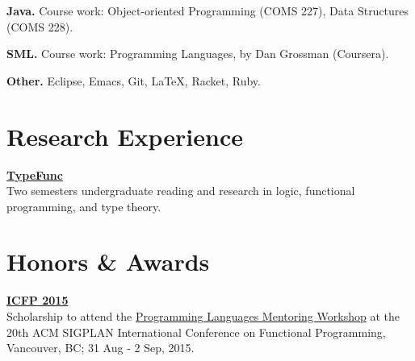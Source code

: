 \documentclass[margin,line]{resume}
\begin{document}
\begin{resume}
    \textbf{Java.} Course work: Object-oriented Programming 
    ({\small COMS 227}), Data Structures ({\small COMS 228}).
   
    \textbf{SML.} Course work: Programming Languages, by Dan Grossman (Coursera).

    \textbf{Other.} Eclipse, Emacs, Git, \LaTeX, Racket, Ruby.

    \section{\mysidestyle Research Experience} 
    {\bf \href{https://github.com/TypeFunc}{TypeFunc}}\\ Two semesters undergraduate reading and research in logic, functional programming, and type theory.
    
    \section{\mysidestyle Honors \& Awards} 

    {\bf \href{http://icfpconference.org/icfp2015/}{ICFP 2015}}\\
    Scholarship to attend the
    \href{https://www.cis.upenn.edu/~sweirich/icfp-plmw15/}{Programming 
    Languages Mentoring Workshop} at the
    20th ACM SIGPLAN International Conference on Functional Programming, 
    Vancouver, BC; 31 Aug - 2 Sep, 2015.

\end{resume}
\end{document}
